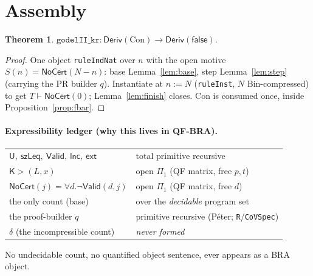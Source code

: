 \documentclass[11pt]{article}
\theoremstyle{plain}
\newtheorem{theorem}{Theorem}[section]
\theoremstyle{definition}
\theoremstyle{remark}
\newcommand{\evalU}{\mathsf{U}}
\newcommand{\Con}{\mathrm{Con}}
\newcommand{\Kgt}{\mathsf{K{>}}}
\newcommand{\Valid}{\mathsf{Valid}}
\newcommand{\NoCert}{\mathsf{NoCert}}
\newcommand{\ext}{\mathsf{ext}}
\newcommand{\lnc}{\mathsf{lnc}}
\newcommand{\false}{\mathsf{false}}
\begin{document}
\section{Assembly}

\begin{theorem}
$\texttt{godelII\_kr} : \mathsf{Deriv}(\Con)\to\mathsf{Deriv}(\false)$.
\end{theorem}
\begin{proof}
One object \texttt{ruleIndNat} over $n$ with the open motive $S(n)=\NoCert(N-n)$:
base Lemma~\ref{lem:base}, step Lemma~\ref{lem:step} (carrying the PR builder $q$).
Instantiate at $n:=N$ (\texttt{ruleInst}, $N$ Bin-compressed) to get
$T\vdash\NoCert(0)$; Lemma~\ref{lem:finish} closes. $\Con$ is consumed once, inside
Proposition~\ref{prop:fbar}.
\end{proof}

\paragraph{Expressibility ledger (why this lives in QF-BRA).}
\begin{center}
\begin{tabular}{ll}
$\evalU,\ \mathsf{szLeq},\ \Valid,\ \lnc,\ \ext$ & total primitive recursive \\
$\Kgt(L,x)$ & open $\Pi_1$ (QF matrix, free $p,t$) \\
$\NoCert(j)=\forall d.\neg\Valid(d,j)$ & open $\Pi_1$ (QF matrix, free $d$) \\
the only count (base) & over the \emph{decidable} program set \\
the proof-builder $q$ & primitive recursive (P\'eter; \texttt{R}/\texttt{CoVSpec}) \\
$\delta$ (the incompressible count) & \emph{never formed} \\
\end{tabular}
\end{center}
No undecidable count, no quantified object sentence, ever appears as a BRA object.
\end{document}
